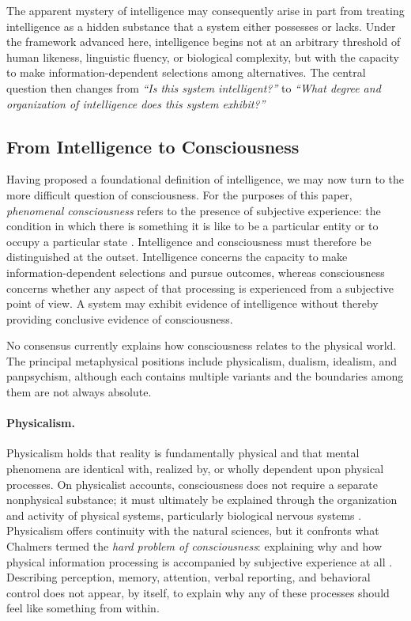 The apparent mystery of intelligence may consequently arise in part from treating
intelligence as a hidden substance that a system either possesses or lacks. Under
the framework advanced here, intelligence begins not at an arbitrary threshold of
human likeness, linguistic fluency, or biological complexity, but with the
capacity to make information-dependent selections among alternatives. The central
question then changes from \emph{``Is this system intelligent?''} to \emph{``What
degree and organization of intelligence does this system exhibit?''}

\subsection{From Intelligence to Consciousness}
\label{subsec:intelligence-consciousness}

Having proposed a foundational definition of intelligence, we may now turn to the
more difficult question of consciousness. For the purposes of this paper,
\emph{phenomenal consciousness} refers to the presence of subjective experience:
the condition in which there is something it is like to be a particular entity or
to occupy a particular state
\cite{nagel1974what,block1995confusion,chalmers1995facing}. Intelligence and
consciousness must therefore be distinguished at the outset. Intelligence concerns
the capacity to make information-dependent selections and pursue outcomes,
whereas consciousness concerns whether any aspect of that processing is
experienced from a subjective point of view. A system may exhibit evidence of
intelligence without thereby providing conclusive evidence of consciousness.

No consensus currently explains how consciousness relates to the physical world.
The principal metaphysical positions include physicalism, dualism, idealism, and
panpsychism, although each contains multiple variants and the boundaries among
them are not always absolute.

\paragraph{Physicalism.}
Physicalism holds that reality is fundamentally physical and that mental phenomena
are identical with, realized by, or wholly dependent upon physical processes. On
physicalist accounts, consciousness does not require a separate nonphysical
substance; it must ultimately be explained through the organization and activity
of physical systems, particularly biological nervous systems
\cite{stoljar2010physicalism,papineau2002thinking}. Physicalism offers continuity
with the natural sciences, but it confronts what Chalmers termed the \emph{hard
problem of consciousness}: explaining why and how physical information processing
is accompanied by subjective experience at all \cite{chalmers1995facing}.
Describing perception, memory, attention, verbal reporting, and behavioral control
does not appear, by itself, to explain why any of these processes should feel like
something from within.

